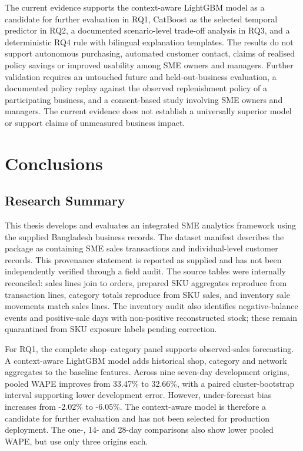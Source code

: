 \documentclass[a4paper,11pt,oneside]{book}
\makeatletter
\def\cleardoublepage{\clearpage\if@twoside \ifodd\c@page\else
\hbox{}
\thispagestyle{empty}
\newpage
\if@twocolumn\hbox{}\newpage\fi\fi\fi}
\theoremstyle{plain}
\theoremstyle{definition}
\theoremstyle{remark}
\makeatother
\begin{document}
The current evidence supports the context-aware LightGBM model as a
candidate for further evaluation in RQ1, CatBoost as the selected temporal
predictor in RQ2, a documented scenario-level trade-off analysis in RQ3, and
a deterministic RQ4 rule with bilingual explanation templates. The results
do not support autonomous purchasing, automated customer contact, claims of
realised policy savings or improved usability among SME owners and managers.
Further validation requires an untouched future and held-out-business
evaluation, a documented policy replay against the observed replenishment
policy of a participating business, and a consent-based study involving SME
owners and managers. The current evidence does not establish a universally
superior model or support claims of unmeasured business impact.

\cleardoublepage
\chapter{Conclusions}
\label{chapter_conclusion}

\section{Research Summary}

This thesis develops and evaluates an integrated SME analytics framework
using the supplied Bangladesh business records. The dataset manifest describes the package as containing SME sales
transactions and individual-level customer records. This provenance
statement is reported as supplied and has not been independently verified
through a field audit. The source tables were internally reconciled: sales
lines join to orders, prepared SKU aggregates reproduce from transaction
lines, category totals reproduce from SKU sales, and inventory sale
movements match sales lines. The
inventory audit also identifies negative-balance events and positive-sale
days with non-positive reconstructed stock; these remain quarantined from
SKU exposure labels pending correction.

For RQ1, the complete shop--category panel supports observed-sales
forecasting. A context-aware LightGBM model adds historical shop,
category and network aggregates to the baseline features. Across nine
seven-day development origins, pooled WAPE improves from 33.47\% to
32.66\%, with a paired cluster-bootstrap interval supporting lower
development error. However, under-forecast bias increases from -2.02\%
to -6.05\%. The context-aware model is therefore a candidate for further
evaluation and has not been selected for production deployment. The one-, 14- and 28-day comparisons
also show lower pooled WAPE, but use only three origins each.
\end{document}
